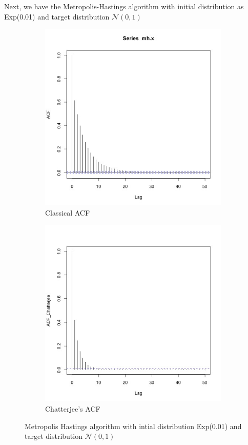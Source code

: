 \documentclass{article}
\begin{document}
	Next, we have the Metropolis-Hastings algorithm with initial distribution as Exp(0.01) and target distribution $\mathcal{N}(0, 1)$
	\begin{figure}[H]
		\centering
		\begin{subfigure}[b]{0.4\linewidth}
			\includegraphics[width=\linewidth]{acf_mh.jpg}
			\caption{Classical ACF}
		\end{subfigure}
		\begin{subfigure}[b]{0.4\linewidth}
			\includegraphics[width=\linewidth]{acf_mh_chatterjee.jpg}
			\caption{Chatterjee's ACF}
		\end{subfigure}
		\caption{Metropolis Hastings algorithm with intial distribution Exp(0.01) and target distribution $\mathcal{N}(0, 1)$}
		\label{fig:mh_acf}
	\end{figure}
\end{document}
